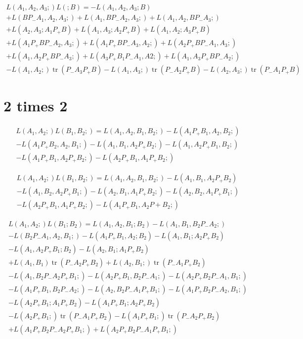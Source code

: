 \documentclass[b5paper,draft,openbib,12pt]{memoir}
\DeclareMathOperator{\tr}{tr}
\begin{document}
\begin{multline}
L(A_1,A_2,A_3;)L(;B) = -L(A_1,A_2,A_3;B)\\
+ L(BP_-A_1,A_2,A_3;) + L(A_1,BP_-A_2,A_3;) + L(A_1,A_2,BP_-A_3;)\\
+L(A_2,A_3;A_1P_+B) + L(A_1,A_3;A_2P_+B) +L(A_1,A_2;A_3P_+B)\\
+L(A_1P_+BP_-A_2,A_3;) + L(A_1P_+BP_-A_3,A_2;) + L(A_2P_+BP_-A_1,A_3;)\\
+L(A_1,A_2P_+BP_-A_3;) + L(A_3P_+B_1P_-A_1,A2;) + L(A_1,A_3P_+BP_-A_2;)\\
-L(A_1,A_2;)\tr(P_-A_3P_+B) - L(A_1,A_3;)\tr(P_-A_2P_+B) - L(A_2,A_3;) \tr(P_-A_1P_+B)
\end{multline}


\section{2 times 2}

\begin{multline}
L(A_1,A_2;)L(B_1,B_2;)= L(A_1,A_2,B_1,B_2;) -L(A_1P_+B_1,A_2,B_2;)\\
-L(A_1P_+B_2,A_2,B_1;) - L(A_1,B_1,A_2P_+B_2;) - L(A_1,A_2P_+B_1,B_2;)\\
-L(A_1P_+B_1,A_2P_+B_2;) - L(A_2P_+B_1,A_1P_+B_2;)
\end{multline}

\begin{multline}
L(A_1,A_2;)L(B_1,B_2;)= L(A_1,A_2,B_1,B_2;)-L(A_1,B_1,A_2P_+B_2) \\
-L(A_1,B_2,A_2P_+B_1;) - L(A_2,B_1,A_1P_+B_2;) - L(A_2,B_2, A_1P_+B_1;)\\
-L(A_2P_+B_1,A_1P_+B_2;)- L(A_1P_+B_1,A_2P+B_2;)
\end{multline}

\begin{multline}
L(A_1,A_2;)L(B_1;B_2)= L(A_1,A_2,B_1;B_2) - L(A_1,B_1,B_2P_-A_2;)\\
-L(B_2P_-A_1,A_2,B_1;)-L(A_1P_+B_1,A_2;B_2)-L(A_1,B_1;A_2P_+B_2)\\
-L(A_1,A_2P_+B_1;B_2) - L(A_2,B_1;A_1P_+B_2)\\
+L(A_1,B_1)\tr(P_-A_2P_+B_2) +L(A_2,B_1;)\tr(P_-A_1P_+B_2) \\
-L(A_1,B_2P_-A_2P_+B_1;) -L(A_2P_+B_1,B_2P_-A_1;) -L(A_2P_+B_2P_-A_1,B_1;)\\
-L(A_1P_+B_1,B_2P_-A_2;) -L(A_2,B_2P_-A_1P_+B_1;) -L(A_1P_+B_2P_-A_2,B_1;)\\
-L(A_2P_+B_1;A_1P_+B_2) - L(A_1P_+B_1;A_2P_+B_2)\\
-L(A_2P_+B_1;)\tr(P_-A_1P_+B_2) - L(A_1 P_+B_1;) \tr(P_-A_2P_+B_2)\\
+L(A_1P_+B_2P_-A_2P_+B_1;) +L(A_2P_+B_2P_-A_1P_+B_1;)
\end{multline}
\end{document}
